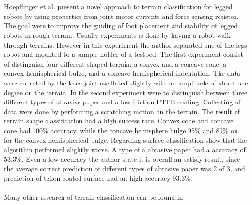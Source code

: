 \documentclass[USenglish]{ifimaster}  %
\begin{document}
\\
\\
Hoepflinger et al. \cite{5509309} present a novel approach to terrain classification for legged robots by using properties from joint motor currents and force sensing resistor. The goal were to improve the guiding of foot placement and stability of legged robots in rough terrain. Usually experiments is done by having a robot walk through terrains. However in this experiment the author separated one of the legs robot and mounted to a sample holder of a testbed. The first experiment consist of distinguish four different shaped terrain: a convex and a concave cone, a convex hemispherical bulge, and a concave hemispherical indentation. The data were collected by the knee-joint oscillated slightly with an amplitude of about one degree on the terrain. In the second experiment were to distinguish between three different types of abrasive paper and a low friction PTFE coating. Collecting of data were done by performing a scratching motion on the terrain. The result of terrain shape classification had a high success rate. Convex cone and concave cone had 100\% accuracy, while the concave hemisphere bulge 95\% and 80\% on for the convex hemispherical bulge. Regarding surface classification show that the algorithm performed slightly worse. A type of a abrasive paper had a accuracy of 53.3\%. Even a low accuracy the author state it is overall an satisfy result, since the average correct prediction of different types of abrasive paper was 2 of 3, and prediction of teflon coated surface had an high accuracy 93.3\%.
\\
\\
Many other research of terrain classification can be found in \cite{Giguere2009,6386243,6569179,6569179,4399500}


\end{document}
